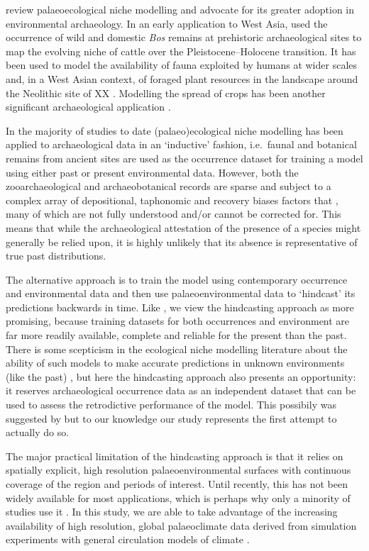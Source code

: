\documentclass[
  authoryear,
  preprint]{elsarticle}
\begin{document}
\citet{FranklinEtAl2015} review palaeoecological niche modelling and
advocate for its greater adoption in environmental archaeology. In an
early application to West Asia, \citet{ConollyEtAl2012} used the
occurrence of wild and domestic \emph{Bos} remains at prehistoric
archaeological sites to map the evolving niche of cattle over the
Pleistocene--Holocene transition. It has been used to model the
availability of fauna exploited by humans at wider scales
\citep[e.g.][]{deAndresHerreroEtAl2018, YaworskyEtAl2023} and, in a West
Asian context, of foraged plant resources in the landscape around the
Neolithic site of XX \citep{CollinsEtAl2018}. Modelling the spread of
crops has been another significant archaeological application
\citep{CremaEtAl}.

In the majority of studies to date (palaeo)ecological niche modelling
has been applied to archaeological data in an `inductive' fashion,
i.e.~faunal and botanical remains from ancient sites are used as the
occurrence dataset for training a model using either past or present
environmental data. However, both the zooarchaeological and
archaeobotanical records are sparse and subject to a complex array of
depositional, taphonomic and recovery biases factors that , many of
which are not fully understood and/or cannot be corrected for. This
means that while the archaeological attestation of the presence of a
species might generally be relied upon, it is highly unlikely that its
absence is representative of true past distributions.

The alternative approach is to train the model using contemporary
occurrence and environmental data and then use palaeoenvironmental data
to `hindcast' its predictions backwards in time. Like
\citet{FranklinEtAl2015}, we view the hindcasting approach as more
promising, because training datasets for both occurrences and
environment are far more readily available, complete and reliable for
the present than the past. There is some scepticism in the ecological
niche modelling literature about the ability of such models to make
accurate predictions in unknown environments (like the past)
\citep{CITES}, but here the hindcasting approach also presents an
opportunity: it reserves archaeological occurrence data as an
independent dataset that can be used to assess the retrodictive
performance of the model. This possibily was suggested by
\citet{FranklinEtAl2015} but to our knowledge our study represents the
first attempt to actually do so.

The major practical limitation of the hindcasting approach is that it
relies on spatially explicit, high resolution palaeoenvironmental
surfaces with continuous coverage of the region and periods of interest.
Until recently, this has not been widely available for most
applications, which is perhaps why only a minority of studies use it
\citep[cf.][]{YaworskyEtAl2023}. In this study, we are able to take
advantage of the increasing availability of high resolution, global
palaeoclimate data derived from simulation experiments with general
circulation models of climate
\citep{BrownEtAl2018, BrownEtAl2020, KargerEtAl2023}.
\end{document}
